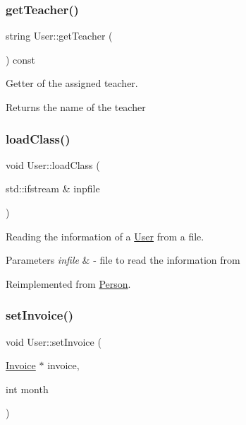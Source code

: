 \subsubsection{\texorpdfstring{get\+Teacher()}{getTeacher()}}
{\footnotesize\ttfamily string User\+::get\+Teacher (\begin{DoxyParamCaption}{ }\end{DoxyParamCaption}) const}



Getter of the assigned teacher. 

\begin{DoxyReturn}{Returns}
the name of the teacher 
\end{DoxyReturn}
\mbox{\label{class_user_abc12a9ca668bd860a3d6d2ae4791997d}} 
\subsubsection{\texorpdfstring{load\+Class()}{loadClass()}}
{\footnotesize\ttfamily void User\+::load\+Class (\begin{DoxyParamCaption}\item[{std\+::ifstream \&}]{inpfile }\end{DoxyParamCaption})\hspace{0.3cm}{\ttfamily [virtual]}}



Reading the information of a \mbox{\hyperlink{class_user}{User}} from a file. 


\begin{DoxyParams}{Parameters}
{\em infile} & -\/ file to read the information from \\
\hline
\end{DoxyParams}


Reimplemented from \mbox{\hyperlink{class_person_af07a032df8d56dddade4dc43960b536b}{Person}}.

\mbox{\label{class_user_ad0432b83c7379ca57ed782d2929f3b8a}} 
\subsubsection{\texorpdfstring{set\+Invoice()}{setInvoice()}}
{\footnotesize\ttfamily void User\+::set\+Invoice (\begin{DoxyParamCaption}\item[{\mbox{\hyperlink{class_invoice}{Invoice}} $\ast$}]{invoice,  }\item[{int}]{month }\end{DoxyParamCaption})}

